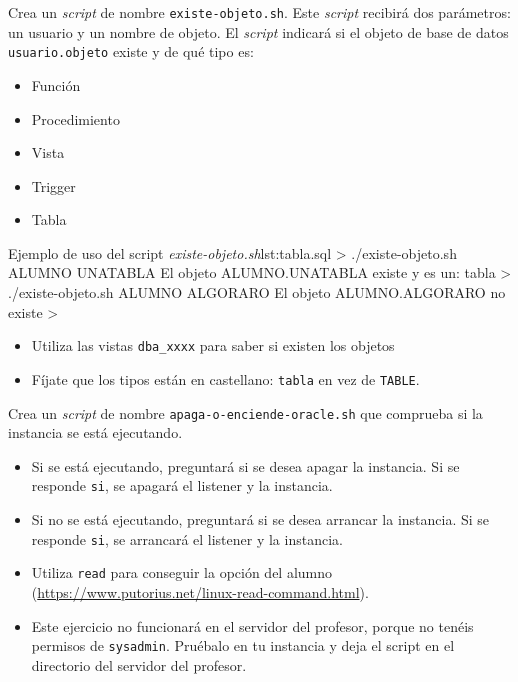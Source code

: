 \begin{homeworkProblem}
  Crea un \textit{script} de nombre \texttt{existe-objeto.sh}. Este \textit{script} recibirá dos parámetros: un usuario y un nombre de objeto. El \textit{script} indicará si el objeto de base de datos \texttt{usuario.objeto} existe y de qué tipo es:
  \begin{itemize}
  \item Función
  \item Procedimiento
  \item Vista
  \item Trigger
  \item Tabla
  \end{itemize}
  
  \begin{listadoshell}{Ejemplo de uso del script \textit{existe-objeto.sh}}{lst:tabla.sql}
    > ./existe-objeto.sh ALUMNO UNATABLA
    El objeto ALUMNO.UNATABLA existe y es un: tabla
    > ./existe-objeto.sh ALUMNO ALGORARO
    El objeto ALUMNO.ALGORARO no existe
    >
  \end{listadoshell}
  
  \begin{Aviso}[Ayuda]
    \begin{itemize}
    \item Utiliza las vistas \texttt{dba\_xxxx} para saber si existen los objetos
    \item Fíjate que los tipos están en castellano: \texttt{tabla} en vez de \texttt{TABLE}.
    \end{itemize}
  \end{Aviso}
  
\end{homeworkProblem}

\begin{homeworkProblem}
  Crea un \textit{script} de nombre \texttt{apaga-o-enciende-oracle.sh} que comprueba si la instancia se está ejecutando.
  \begin{itemize}
  \item Si se está ejecutando, preguntará si se desea apagar la instancia. Si se responde \texttt{si}, se apagará el listener y la instancia.
  \item Si no se está ejecutando, preguntará si se desea arrancar la instancia. Si se responde \texttt{si}, se arrancará el listener y la instancia.
  \end{itemize}

  \begin{Aviso}[Ayuda]
    \begin{itemize}
    \item Utiliza \texttt{read} para conseguir la opción del alumno (\url{https://www.putorius.net/linux-read-command.html}).
    \item Este ejercicio no funcionará en el servidor del profesor, porque no tenéis permisos de \texttt{sysadmin}. Pruébalo en tu instancia y deja el script en el directorio del servidor del profesor.
    \end{itemize}
  \end{Aviso}
\end{homeworkProblem}

